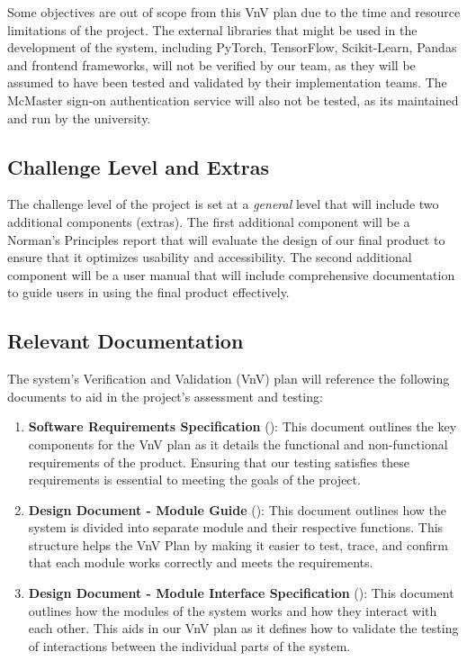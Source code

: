 \documentclass[12pt, titlepage]{article}
\begin{document}
Some objectives are out of scope from this VnV plan due to the time
and resource limitations of the project.
The external libraries that might be used in the development of the
system, including PyTorch, TensorFlow, Scikit-Learn, Pandas and
frontend frameworks, will not be verified by our team, as they will
be assumed to have been tested and validated by their implementation teams.
The McMaster sign-on authentication service will also not be tested,
as its maintained and run by the university.

\subsection{Challenge Level and Extras}

The challenge level of the project is set at a \textit{general} level
that will include two additional
components (extras). The first additional component will be a
Norman's Principles report that will
evaluate the design of our final product to ensure that it optimizes
usability and accessibility. The second additional
component will be a user manual that will include comprehensive
documentation to guide users in using the final
product effectively.

\subsection{Relevant Documentation}
The system's Verification and Validation (VnV) plan will reference the
following documents to aid in
the project's assessment and testing:
\begin{enumerate}
  \item \textbf{Software Requirements Specification} (\citet{SRS}):
    This document outlines the key components
    for the VnV plan as it details the functional and non-functional
    requirements of the product. Ensuring that our testing
    satisfies these requirements is essential to meeting the goals of
    the project.
  \item \textbf{Design Document - Module Guide} (\citet{MG}): This
    document outlines how the system is divided into separate module
    and their respective functions.
    This structure helps the VnV Plan by making it easier to test,
    trace, and confirm that each module works correctly and meets the
    requirements.
  \item \textbf{Design Document - Module Interface Specification}
    (\citet{MIS}): This document outlines how the modules of the
    system works and how they interact with each other.
    This aids in our VnV plan as it defines how to validate the
    testing of interactions between the individual parts of the system.
\end{enumerate}
\end{document}
